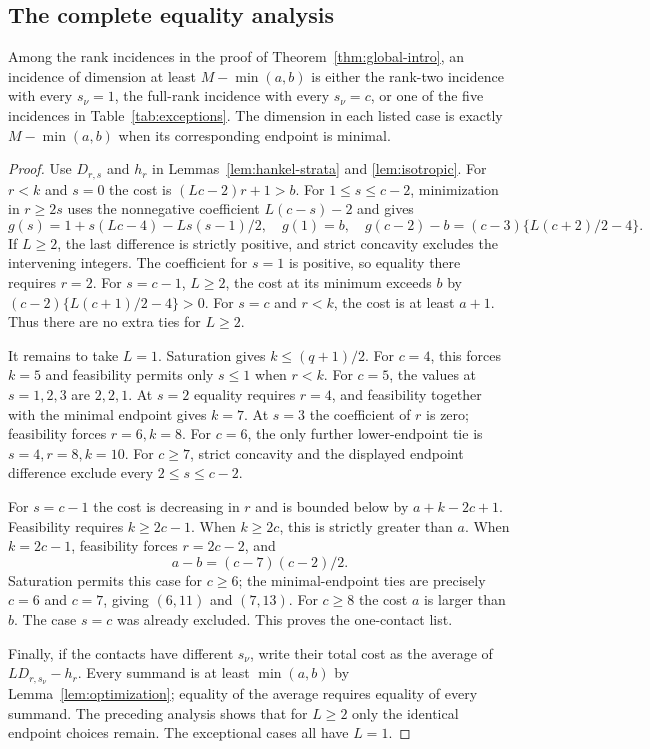\subsection{The complete equality analysis}
\begin{lemma}\label{lem:all-ties}
Among the rank incidences in the proof of
Theorem~\ref{thm:global-intro}, an incidence of dimension at least
$M-\min(a,b)$ is either the rank-two incidence with every $s_\nu=1$,
the full-rank incidence with every $s_\nu=c$, or one of the five
incidences in Table~\ref{tab:exceptions}. The dimension in each listed
case is exactly $M-\min(a,b)$ when its corresponding endpoint is minimal.
\end{lemma}
\begin{proof}
Use $D_{r,s}$ and $h_r$ in Lemmas~\ref{lem:hankel-strata} and
\ref{lem:isotropic}. For $r<k$ and $s=0$ the cost is
$(Lc-2)r+1>b$. For $1\le s\le c-2$, minimization in $r\ge2s$
uses the nonnegative coefficient $L(c-s)-2$ and gives
\[
 g(s)=1+s(Lc-4)-Ls(s-1)/2,
 \quad g(1)=b,
 \quad g(c-2)-b=(c-3)\{L(c+2)/2-4\}.
\]
If $L\ge2$, the last difference is strictly positive, and strict
concavity excludes the intervening integers. The coefficient for $s=1$
is positive, so equality there requires $r=2$.
For $s=c-1$, $L\ge2$, the cost at its minimum exceeds $b$ by
$(c-2)\{L(c+1)/2-4\}>0$. For $s=c$ and $r<k$, the cost is at
least $a+1$. Thus there are no extra ties for $L\ge2$.

It remains to take $L=1$. Saturation gives $k\le(q+1)/2$.
For $c=4$, this forces $k=5$ and feasibility permits only $s\le1$
when $r<k$. For $c=5$, the values at $s=1,2,3$ are $2,2,1$.
At $s=2$ equality requires $r=4$, and feasibility together with the
minimal endpoint gives $k=7$. At $s=3$ the coefficient of $r$ is zero;
feasibility forces $r=6,k=8$. For $c=6$, the only further lower-endpoint
tie is $s=4,r=8,k=10$.
For $c\ge7$, strict concavity and the displayed endpoint difference
exclude every $2\le s\le c-2$.

For $s=c-1$ the cost is decreasing in $r$ and is bounded below by
$a+k-2c+1$. Feasibility requires $k\ge2c-1$.
When $k\ge2c$, this is strictly greater than $a$.
When $k=2c-1$, feasibility forces $r=2c-2$, and
\[
 a-b=(c-7)(c-2)/2.
\]
Saturation permits this case for $c\ge6$; the minimal-endpoint ties
are precisely $c=6$ and $c=7$, giving $(6,11)$ and $(7,13)$.
For $c\ge8$ the cost $a$ is larger than $b$. The case $s=c$ was
already excluded. This proves the one-contact list.

Finally, if the contacts have different $s_\nu$, write their total cost
as the average of $LD_{r,s_\nu}-h_r$. Every summand is at least
$\min(a,b)$ by Lemma~\ref{lem:optimization}; equality of the average
requires equality of every summand. The preceding analysis shows that
for $L\ge2$ only the identical endpoint choices remain. The exceptional
cases all have $L=1$.
\end{proof}

